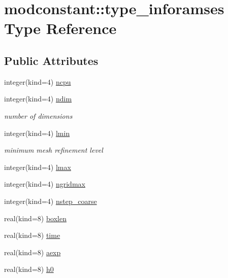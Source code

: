 \hypertarget{structmodconstant_1_1type__inforamses}{\section{modconstant\-:\-:type\-\_\-inforamses Type Reference}
\label{structmodconstant_1_1type__inforamses}
}
\subsection*{Public Attributes}
\begin{DoxyCompactItemize}
\item 
integer(kind=4) \hyperlink{structmodconstant_1_1type__inforamses_a7267e8123e67211ef5ce2c51c1974148}{ncpu}
\item 
integer(kind=4) \hyperlink{structmodconstant_1_1type__inforamses_adf9bb7fc0490aa3a630c9fd7944148a0}{ndim}
\begin{DoxyCompactList}\small\item\em number of dimensions \end{DoxyCompactList}\item 
integer(kind=4) \hyperlink{structmodconstant_1_1type__inforamses_a05881a6c4f31c578ce604dd4f0ba746a}{lmin}
\begin{DoxyCompactList}\small\item\em minimum mesh refinement level \end{DoxyCompactList}\item 
integer(kind=4) \hyperlink{structmodconstant_1_1type__inforamses_ae350ee72500331c8acabc2ebcfce2bd4}{lmax}
\item 
integer(kind=4) \hyperlink{structmodconstant_1_1type__inforamses_a62f64ba9a767a47ca65c383b250c112b}{ngridmax}
\item 
integer(kind=4) \hyperlink{structmodconstant_1_1type__inforamses_a4ac1ad3a415d2865fb8b42e6fa6c2769}{nstep\-\_\-coarse}
\item 
real(kind=8) \hyperlink{structmodconstant_1_1type__inforamses_a836fde885c81b3643ee595c9eb63b19e}{boxlen}
\item 
real(kind=8) \hyperlink{structmodconstant_1_1type__inforamses_ac8a308775ea0956bafceff96094d659d}{time}
\item 
real(kind=8) \hyperlink{structmodconstant_1_1type__inforamses_a7e17a5532f8e65c4977fb71a8379006c}{aexp}
\item 
real(kind=8) \hyperlink{structmodconstant_1_1type__inforamses_a6ceaf1c28dc83b577f72b41e26d988e4}{h0}

\end{DoxyCompactItemize}
